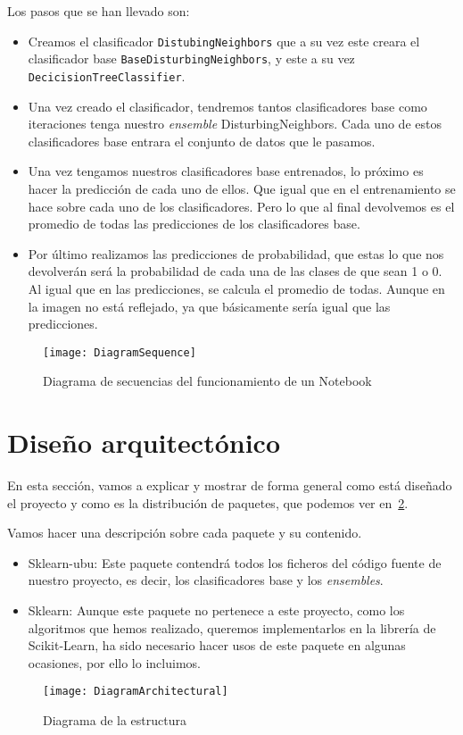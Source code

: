 Los pasos que se han llevado son:
\begin{itemize}
	\item Creamos el clasificador \texttt{DistubingNeighbors} que a su vez este creara el clasificador base \texttt{BaseDisturbingNeighbors}, y este a su vez \texttt{DecicisionTreeClassifier}.
	\item Una vez creado el clasificador, tendremos tantos clasificadores base como iteraciones tenga nuestro \textit{ensemble}  DisturbingNeighbors. Cada uno de estos clasificadores base entrara el conjunto de datos que le pasamos.
	\item Una vez tengamos nuestros clasificadores base entrenados, lo próximo es hacer la predicción de cada uno de ellos. Que igual que en el entrenamiento se hace sobre cada uno de los clasificadores. Pero lo que al final devolvemos es el promedio de todas las predicciones de los clasificadores base.
	\item Por último realizamos las predicciones de probabilidad, que estas lo que nos devolverán será la probabilidad de cada una de las clases de que sean 1 o 0. Al igual que en las predicciones, se calcula el promedio de todas. Aunque en la imagen no está reflejado, ya que básicamente sería igual que las predicciones. 
\end{itemize}
\begin{figure}
\centering
\texttt{[image: DiagramSequence]}
\caption{Diagrama de secuencias del funcionamiento de un Notebook}
\label{fig:DiagramSequence}
\end{figure}

\section{Diseño arquitectónico}
En esta sección, vamos a explicar y mostrar de forma general como está diseñado el proyecto y como es la distribución de paquetes, que podemos ver en~\ref{fig:DiagramArchitectural}.

Vamos hacer una descripción sobre cada paquete y su contenido.
\begin{itemize}
	\item Sklearn-ubu: Este paquete contendrá todos los ficheros del código fuente de nuestro proyecto, es decir, los clasificadores base y los \textit{ensembles}.
	
	\item Sklearn: Aunque este paquete no pertenece a este proyecto, como los algoritmos que hemos realizado, queremos implementarlos en la librería de Scikit-Learn, ha sido necesario hacer usos de este paquete en algunas ocasiones, por ello lo incluimos.
	
\end{itemize}
\begin{figure}
\centering
\texttt{[image: DiagramArchitectural]}
\caption{Diagrama de la estructura}
\label{fig:DiagramArchitectural}
\end{figure}
